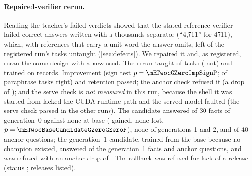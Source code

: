 \paragraph{Repaired-verifier rerun.} Reading the teacher's failed verdicts showed that the stated-reference
verifier failed correct answers written with a thousands separator (``4,711'' for 4711), which, with
references that carry a unit word the answer omits, left \mETworGZeroNever{} of the registered run's
\mETworGZeroTasks{} tasks untaught (\cref{sec:defects}). We repaired it and, as
registered, reran the same design with a new seed. The rerun taught \mETwocGZeroTaught{} of \mETwocGZeroTasks{} tasks
(\mETwocGZeroNever{} not) and trained on \mETwocGZeroTrainRecords{} records. Improvement (sign test
$p=\mETwocGZeroImpSignP$; \mETwocGZeroImpVariantsRight{} of \mETwocGZeroImpVariantsN{} paraphrase tasks right) and
retention passed; the anchor check refused it (a drop of \mETwocGZeroAnchorDrop); and the serve check is
\emph{not measured} in this run, because the shell it was started from lacked the CUDA runtime path
and the served model faulted (the serve check passed in the other runs). The candidate answered \mETwocCandidateGZeroGZero{}
of 30 facts of generation~0 against none at base (\mETwocBaseCandidateGZeroGZeroGained{} gained, none lost,
$p=\mETwocBaseCandidateGZeroGZeroP$), none of generations 1 and 2, and \mETwocCandidateGZeroAnchor{} of 40 anchor
questions; the generation~1 candidate, trained from the base because no champion existed, answered
\mETwocCandidateGOneGOne{} of the generation~1 facts and \mETwocCandidateGOneAnchor{} anchor questions, and was refused
with an anchor drop of \mETwocGOneAnchorDrop. The rollback was refused for lack of a release (status
\mETwocRollbackExit; \mETwocReleasesFinal{} releases listed).

